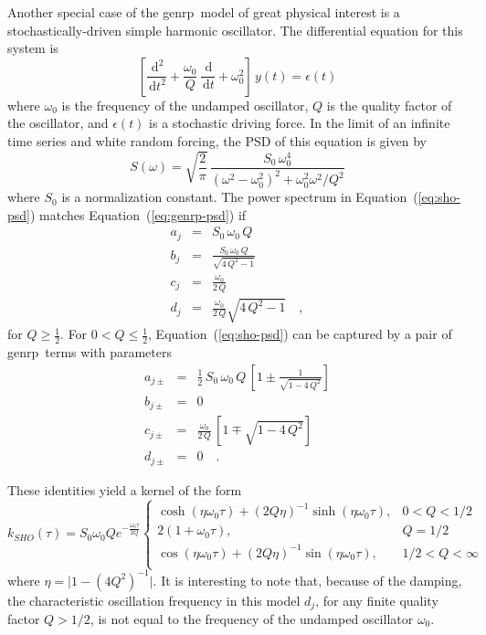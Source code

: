 \documentclass[manuscript, letterpaper]{aastex6}
\newcommand{\project}[1]{\textsf{#1}}
\newcommand{\genrp}{\project{genrp}}
\renewcommand{\eqref}[1]{\ref{eq:#1}}
\newcommand{\Eq}[1]{Equation~(\eqref{#1})}
\newcommand{\eq}[1]{\Eq{#1}}
\newcommand{\eqlabel}[1]{\label{eq:#1}}
\newcommand{\dd}{\ensuremath{\,\mathrm{d}}}
\begin{document}
Another special case of the \genrp\ model of great physical interest is a
stochastically-driven simple harmonic oscillator.
The differential equation for this system is
\begin{equation}
    \left[\frac{\dd^2}{\dd t^2} + \frac{\omega_0}{Q}\,\frac{\dd}{\dd t}
    + \omega_0^2\right]\, y(t) = \epsilon(t)
\end{equation}
where $\omega_0$ is the frequency of the undamped oscillator, $Q$ is the
quality factor of the oscillator, and $\epsilon(t)$ is a stochastic driving
force.
In the limit of an infinite time series and white random forcing, the PSD of
this equation is given by \citep{Anderson:1990}
\begin{equation}\eqlabel{sho-psd}
S(\omega) = \sqrt{\frac{2}{\pi}}\,\frac{S_0\,\omega_0^4}
    {(\omega^2-\omega_0^2)^2 + \omega_0^2\omega^2/Q^2}
\end{equation}
where $S_0$ is a normalization constant.
The power spectrum in \eq{sho-psd} matches \eq{genrp-psd} if
\begin{eqnarray}
a_j &=& S_0\,\omega_0\,Q \\
b_j &=& \frac{S_0\,\omega_0\,Q}{\sqrt{4\,Q^2-1}} \\
c_j &=& \frac{\omega_0}{2\,Q}\\
d_j &=& \frac{\omega_0}{2\,Q} \sqrt{4\,Q^2-1} \quad,
\end{eqnarray}
for $Q \ge \frac{1}{2}$.
For $0 < Q \le \frac{1}{2}$, \eq{sho-psd} can be captured by a pair of \genrp\
terms with parameters
\begin{eqnarray}
a_{j\pm} &=& \frac{1}{2}\,S_0\,\omega_0\,Q\,\left[ 1 \pm
        \frac{1}{\sqrt{1-4\,Q^2}}\right] \\
b_{j\pm} &=& 0 \\
    c_{j\pm} &=& \frac{\omega_0}{2\,Q}\,\left[1 \mp \sqrt{1-4\,Q^2}\right] \\
d_{j\pm} &=& 0 \quad.
\end{eqnarray}

These identities yield a kernel of the form
\begin{equation}
k_{SHO}(\tau) = S_0 \omega_0 Q e^{-\frac{\omega_0 \tau}{2Q}} \begin{cases}
\cosh{(\eta \omega_0 \tau)} + (2Q\eta)^{-1} \sinh{(\eta \omega_0 \tau)}, & 0 < Q < 1/2\\
2 (1+\omega_0 \tau), & Q = 1/2\\
\cos{(\eta \omega_0 \tau)} + (2Q\eta)^{-1} \sin{(\eta \omega_0 \tau)},& 1/2 < Q < \infty\\
\end{cases}
\end{equation}
where $\eta = \vert 1-(4Q^2)^{-1}\vert$.
It is interesting to note that, because of the damping, the characteristic
oscillation frequency in this model $d_j$, for any finite quality factor $Q > 1/2$,
is not equal to the frequency of the undamped oscillator $\omega_0$.
\end{document}
